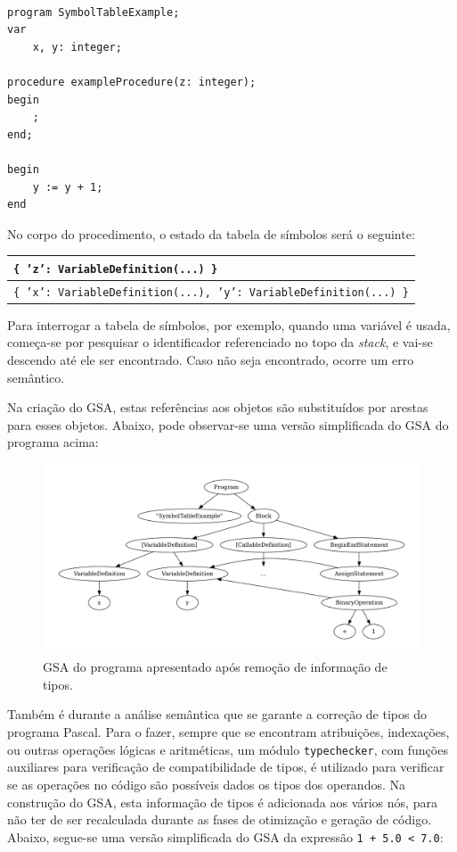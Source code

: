 \documentclass[12pt, a4paper]{article}
\begin{document}
\lstset{
    language=pascal
}

\begin{lstlisting}

program SymbolTableExample;
var
    x, y: integer;

procedure exampleProcedure(z: integer);
begin
    ;
end;

begin
    y := y + 1;
end
\end{lstlisting}

No corpo do procedimento, o estado da tabela de símbolos será o seguinte:

\begin{tabular}{|>{\centering\arraybackslash}p{\textwidth}|}
    \hline
    \texttt{\{ 'z': VariableDefinition(...) \}} \\
    \hline
    \texttt{\{ 'x': VariableDefinition(...), 'y': VariableDefinition(...) \}} \\
    \hline
\end{tabular}

Para interrogar a tabela de símbolos, por exemplo, quando uma variável é usada, começa-se por
pesquisar o identificador referenciado no topo da \emph{stack}, e vai-se descendo até ele ser
encontrado. Caso não seja encontrado, ocorre um erro semântico.

Na criação do GSA, estas referências aos objetos são substituídos por arestas para esses objetos.
Abaixo, pode observar-se uma versão simplificada do GSA do programa acima:

\begin{figure}[H]
    \centering
    \includegraphics[width=\textwidth]{res/variable-reference.pdf}
    \caption{GSA do programa apresentado após remoção de informação de tipos.}
\end{figure}

Também é durante a análise semântica que se garante a correção de tipos do programa Pascal. Para o
fazer, sempre que se encontram atribuições, indexações, ou outras operações lógicas e aritméticas,
um módulo \texttt{typechecker}, com funções auxiliares para verificação de compatibilidade de tipos,
é utilizado para verificar se as operações no código são possíveis dados os tipos dos operandos.
Na construção do GSA, esta informação de tipos é adicionada aos vários nós, para não ter de ser
recalculada durante as fases de otimização e geração de código. Abaixo, segue-se uma versão
simplificada do GSA da expressão \texttt{1 + 5.0 < 7.0}:
\end{document}
